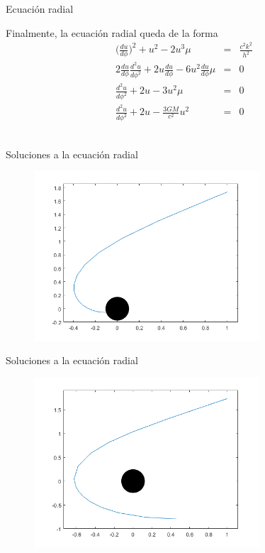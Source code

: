 \documentclass[xcolor=dvipsnames]{beamer}
\begin{document}
    \begin{frame}{Ecuación radial}
    \begin{block}{}
    Finalmente, la ecuación radial queda de la forma
          \begin{eqnarray*}
    \Big(\frac{du}{d\phi}\Big)^{2}+u^{2}-2u^{3}\mu&=&\frac{c^{2}k^{2}}{h^{2}} \\
    2\frac{du}{d\phi}\frac{d^{2}u}{d\phi^{2}}+2u\frac{du}{d\phi}-6u^{2}\frac{du}{d\phi}\mu&=&0\\
    \frac{d^{2}u}{d\phi^{2}}+2u-3u^{2}\mu&=&0 \\
    \frac{d^{2}u}{d\phi^{2}}+2u-\frac{3GM}{c^{2}}u^{2}&=&0    
    \end{eqnarray*}\\    
    \end{block}
  \end{frame}
  

    \begin{frame}{Soluciones a la ecuación radial}
\begin{figure}
    \centering
    \includegraphics[width=0.75\textwidth]{Presentations/Images/3_foton_en.png}
\end{figure}
  \end{frame}


    \begin{frame}{Soluciones a la ecuación radial}
\begin{figure}
    \centering
    \includegraphics[width=0.75\textwidth]{Presentations/Images/3_foton_esc.png}
\end{figure}
  \end{frame}
\end{document}
